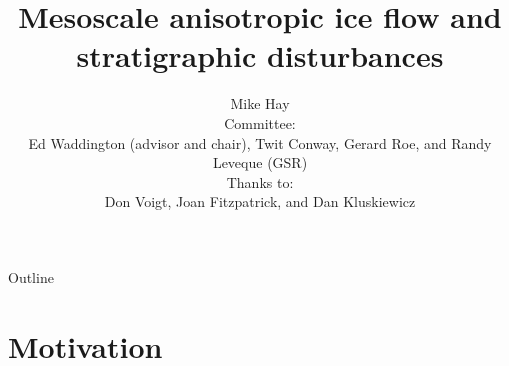 \documentclass{beamer}
\title[Ice anisotropy] %
{Mesoscale anisotropic ice flow and stratigraphic disturbances}
\author[Michael Hay] %
{ 
  Mike Hay \inst{1}\\
  \footnotesize{
    Committee:\\
    Ed Waddington (advisor and chair),  Twit Conway, Gerard Roe, and Randy Leveque (GSR)\\
    Thanks to:\\
    Don Voigt, Joan Fitzpatrick, and Dan Kluskiewicz
    }
  }
\institute[University of Washington] %
{
  \inst{1}%
  Department of Earth and Space Sciences\\
  University of Washington
  \and
  }
\date[CFP 2003] %
\begin{document}
\begin{frame}
  \titlepage
\end{frame}

\begin{frame}{Outline}
  \tableofcontents
\end{frame}





\section{Motivation}
\end{document}
